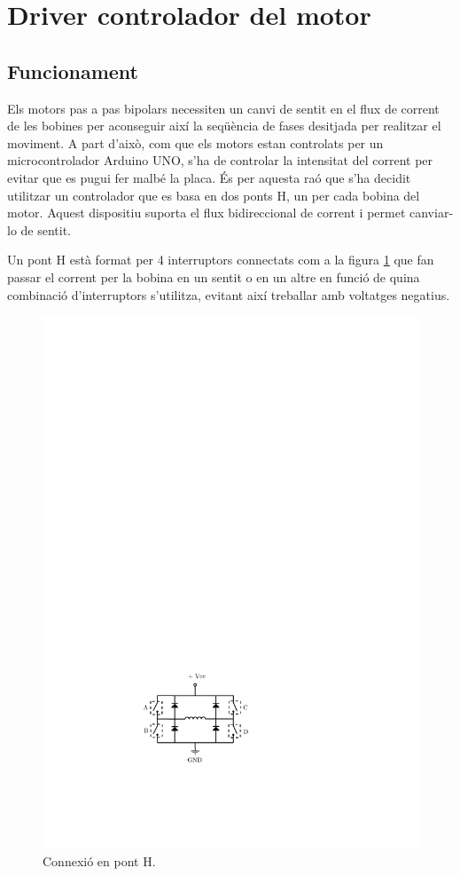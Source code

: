 \section {Driver controlador del motor}\label{sec:driver}

\subsection{Funcionament}

Els motors pas a pas bipolars necessiten un canvi de sentit en el flux de corrent  de les bobines per aconseguir així la seqüència de fases desitjada per realitzar el moviment. A part d'això, com que els motors estan controlats per un microcontrolador Arduino UNO, s'ha de controlar la intensitat del corrent per evitar que es pugui fer malbé la placa. És per aquesta raó que s'ha decidit utilitzar un controlador que es basa en dos ponts H, un per cada bobina del motor. Aquest dispositiu suporta el flux bidireccional de corrent i permet  canviar-lo de sentit.


Un pont H està format per 4 interruptors connectats com a la figura \ref{fig:ponth} que fan passar el corrent per la bobina en un sentit o en un altre en funció de quina combinació d'interruptors s'utilitza, evitant així treballar amb voltatges negatius.

\begin{figure}[H]
	\centering
	\includegraphics{PontH}
	\caption{Connexió en pont H.}
	\label{fig:ponth}
\end{figure}

